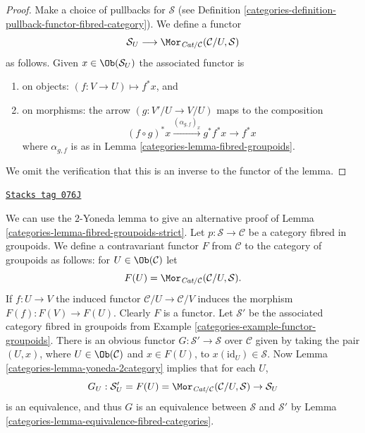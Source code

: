 \begin{proof}

Make a choice of pullbacks for $\mathcal{S}$
(see Definition \ref{categories-definition-pullback-functor-fibred-category}).
We define a functor
$$
\mathcal{S}_U
\longrightarrow
\Mor_{\textit{Cat}/\mathcal{C}}(\mathcal{C}/U, \mathcal{S})
$$
as follows. Given
$x \in \Ob(\mathcal{S}_U)$
the associated functor is
\begin{enumerate}
\item on objects: $(f : V \to U) \mapsto f^*x$, and
\item on morphisms: the arrow $(g : V'/U \to V/U)$ maps to
the composition
$$
(f \circ g)^*x \xrightarrow{(\alpha_{g, f})_x} g^*f^*x \rightarrow f^*x
$$
where $\alpha_{g, f}$ is as in Lemma \ref{categories-lemma-fibred-groupoids}.
\end{enumerate}
We omit the verification that this is an inverse to the functor
of the lemma.
\end{proof}

\begin{remark}
\label{categories-remark-alternative-fibred-groupoids-strict}
\href{https://stacks.math.columbia.edu/tag/076J}{\texttt{Stacks tag 076J}}

We can use the $2$-Yoneda lemma to give an alternative proof of
Lemma \ref{categories-lemma-fibred-groupoids-strict}.
Let $p : \mathcal{S} \to \mathcal{C}$ be a category fibred in groupoids.
We define a contravariant functor $F$ from $\mathcal{C}$ to the
category of groupoids as follows: for $U\in \Ob(\mathcal{C})$
let
$$
F(U) = \Mor_{\textit{Cat}/\mathcal{C}}(\mathcal{C}/U, \mathcal{S}).
$$
If $f : U \to V$ the induced functor $\mathcal{C}/U \to \mathcal{C}/V$
induces the morphism $F(f) : F(V) \to F(U)$. Clearly $F$ is a functor.
Let $\mathcal{S}'$ be the associated category fibred in groupoids from
Example \ref{categories-example-functor-groupoids}.
There is an obvious functor $G : \mathcal{S}' \to \mathcal{S}$
over $\mathcal{C}$ given by taking the pair $(U, x)$, where
$U \in \Ob(\mathcal{C})$ and $x \in F(U)$, to
$x(\text{id}_U) \in \mathcal{S}$. Now
Lemma \ref{categories-lemma-yoneda-2category}
implies that for each $U$,
$$
G_U : \mathcal{S}'_U = F(U)=
\Mor_{\textit{Cat}/\mathcal{C}}(\mathcal{C}/U, \mathcal{S})
\to
\mathcal{S}_U
$$
is an equivalence, and thus $G$ is an equivalence between $\mathcal{S}$ and
$\mathcal{S}'$ by Lemma \ref{categories-lemma-equivalence-fibred-categories}.
\end{remark}


